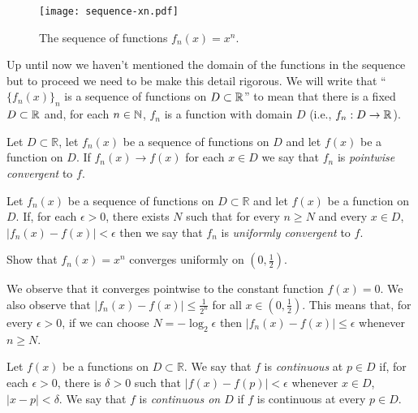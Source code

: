 \begin{figure}
  \begin{center}
    \texttt{[image: sequence-xn.pdf]}
    \caption{The sequence of functions \(f_n(x)= x^n\).}
  \end{center}
\end{figure}

\noindent
Up until now we haven't mentioned the domain of the functions in the sequence but to proceed we need to be make this detail rigorous.
We will write that ``\({\{f_n(x)\}}_{n}\) is a sequence of functions on \(D\subset \mathbb{R}\)'' to mean that there is a fixed \(D\subset \mathbb{R}\) and, for each \(n\in \mathbb{N}\), \(f_{n}\) is a function with domain \(D\) (i.e., \(f_n : D \to \mathbb{R}\)).


\begin{definition}
  Let \(D\subset \mathbb{R}\),
  let \(f_n(x)\) be a sequence of functions on \(D\)
  and let \(f(x)\) be a function on \(D\).
  If \(f_n(x) \to f(x)\) for each \(x\in D\) we say that \(f_n\) is \emph{pointwise convergent} to \(f\).
\end{definition}

\begin{definition}
  Let \(f_n(x)\) be a sequence of functions on \(D\subset \mathbb{R}\)
  and let \(f(x)\) be a function on \(D\).
  If, for each \(\epsilon>0\), there exists \(N\) such that for every \(n\geq N\) and every \(x\in D\), \(|f_n(x) - f(x)| < \epsilon\) then we say that \(f_n\) is \emph{uniformly convergent} to \(f\).
\end{definition}

\begin{example*}
  Show that \(f_n(x) = x^n\) converges uniformly on \((0,\frac{1}{2})\).
\end{example*}

\begin{solution}
  We observe that it converges pointwise to the constant function \(f(x)=0\).
  We also observe that \(|f_n(x) - f(x) | \leq \frac{1}{2^n}\) for all \(x\in (0,\frac{1}{2})\).
  This means that, for every \(\epsilon>0\), if we can choose \(N=-\log_{2}\epsilon\) then \(|f_n(x) - f(x) | \leq \epsilon\) whenever \(n\geq N\).
\end{solution}

\begin{definition}
  Let \(f(x)\) be a functions on \(D\subset \mathbb{R}\).
  We say that \(f\) is \emph{continuous} at \(p\in D\) if, for each \(\epsilon>0\), there is \(\delta >0\) such that \(|f(x)-f(p)| <\epsilon\) whenever \(x\in D\), \(|x-p| <\delta\).
  We say that \(f\) is \emph{continuous on \( D\)} if \(f\) is continuous at every \(p\in D\).
\end{definition}

